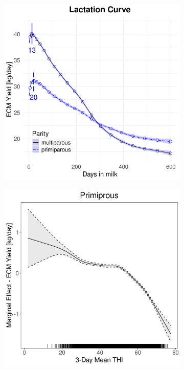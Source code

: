 \begin{figure}[H]
\begin{subfigure}[b]{0.45\textwidth}
        \includegraphics[width=\textwidth]{thesis/figures/models/ecm/full/ho_ecm_full/ho_ecm_full_marginal_dim_milk_combined.png}
    \end{subfigure}
    \begin{subfigure}[b]{0.45\textwidth}
        \centering
        \includegraphics[width=\textwidth]{thesis/figures/models/ecm/full/ho_ecm_full/ho_ecm_full_marginal_thi_milk_primi.png}

\end{subfigure}
\end{figure}
